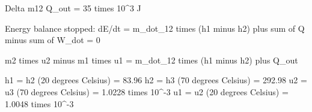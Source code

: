 Delta m12  
Q_out = 35 times 10^3 J  

Energy balance stopped:  
dE/dt = m_dot_12 times (h1 minus h2) plus sum of Q minus sum of W_dot = 0  

m2 times u2 minus m1 times u1 = m_dot_12 times (h1 minus h2) plus Q_out  

h1 = h2 (20 degrees Celsius) = 83.96  
h2 = h3 (70 degrees Celsius) = 292.98  
u2 = u3 (70 degrees Celsius) = 1.0228 times 10^-3  
u1 = u2 (20 degrees Celsius) = 1.0048 times 10^-3